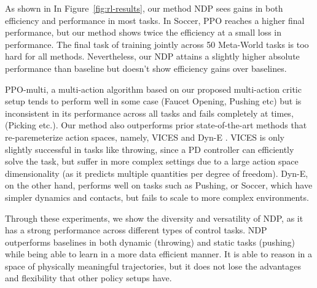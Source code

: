 \documentclass{article}
\newcommand{\our}{NDP\xspace}
\begin{document}
As shown in In Figure~\ref{fig:rl-results}, our method \our sees gains in both efficiency and performance in most tasks. In Soccer, PPO reaches a higher final performance, but our method shows twice the efficiency at a small loss in performance. The final task of training jointly across 50 Meta-World tasks is too hard for all methods. Nevertheless, our NDP attains a slightly higher absolute performance than baseline but doesn't show efficiency gains over baselines.

PPO-multi, a multi-action algorithm based on our proposed multi-action critic setup tends to perform well in some case (Faucet Opening, Pushing etc) but is inconsistent in its performance across all tasks and fails completely at times, (Picking etc.). Our method also outperforms prior state-of-the-art methods that re-paremeterize action spaces, namely, VICES \cite{vices2019martin} and Dyn-E \cite{whitney2019dynamics}. VICES is only slightly successful in tasks like throwing, since a PD controller can efficiently solve the task, but suffer in more complex settings due to a  large action space dimensionality (as it predicts multiple quantities per degree of freedom). Dyn-E, on the other hand, performs well on tasks such as Pushing, or Soccer, which have simpler dynamics and contacts, but fails to scale to more complex environments.

Through these experiments, we show the diversity and versatility of \our, as it has a strong performance across different types of control tasks. \our outperforms baselines in both dynamic (throwing) and static tasks (pushing) while being able to learn in a more data efficient manner. It is able to reason in a space of physically meaningful trajectories, but it does not lose the advantages and flexibility that other policy setups have.
\end{document}
